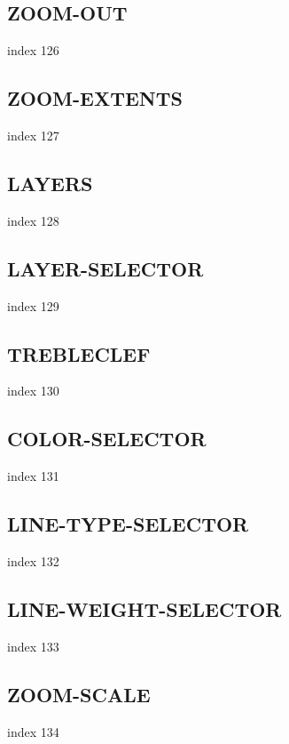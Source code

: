 \documentclass[11pt]{report}
\begin{document}
\subsection{ZOOM-OUT}

index 126

\subsection{ZOOM-EXTENTS}

index 127

\subsection{LAYERS}

index 128

\subsection{LAYER-SELECTOR}

index 129

\subsection{TREBLECLEF}

index 130

\subsection{COLOR-SELECTOR}

index 131

\subsection{LINE-TYPE-SELECTOR}

index 132

\subsection{LINE-WEIGHT-SELECTOR}

index 133

\subsection{ZOOM-SCALE}

index 134
\end{document}
